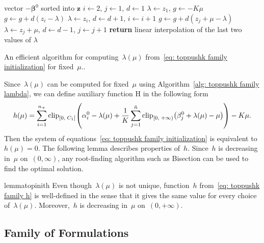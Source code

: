 \begin{algorithm}
  \centering
  \begin{algorithmic}[1]
    \Require vector $-\bm{\beta}^0$ sorted into $\bm{z}$
    \State $i \gets 2$, $j \gets 1$, $d \gets 1$
    \State $\lambda \gets z_1$, $g \gets - K\mu$
        \State $g \gets g + d(z_i - \lambda)$
        \State $\lambda\gets z_i$, $d \gets d+1$, $i \gets i+1$
      \Else
        \State $g \gets g + d(z_j + \mu - \lambda)$
        \State $\lambda \gets z_j + \mu$, $d \gets d - 1$, $j \gets j + 1$
      \EndIf
    \EndWhile
    \State \textbf{return} linear interpolation of the last two values of $\lambda$
  \end{algorithmic}
  \caption{An efficient algorithm for computing~$\lambda(\mu)$ from~\eqref{eq: toppushk family initialization} for fixed~$\mu.$.}
  \label{alg: toppushk family lambda}
\end{algorithm}

Since~$\lambda(\mu)$ can be computed for fixed~$\mu$ using Algorithm~\ref{alg: toppushk family lambda}, we can define auxiliary function H in the following form
\begin{equation}\label{eq: toppushk family h}
  h(\mu)
    = \sum_{i=1}^{\npos} \clip{0}{C_1}{\alpha_i^0 - \lambda(\mu) + \frac{1}{K} \sum_{j=1}^{\ntil} \clip[u]{0}{+\infty}{\beta_j^0+\lambda(\mu) - \mu}} - K \mu.
\end{equation}
Then the system of equations~\eqref{eq: toppushk family initialization} is equivalent to~$h(\mu) = 0.$ The following lemma describes properties of~$h.$ Since~$h$ is decreasing in~$\mu$ on~$(0, \infty)$, any root-finding algorithm such as Bisection can be used to find the optimal solution.

\begin{restatable}{lemma}{topinith}\label{lemma: toppushk family h}
  Even though~$\lambda(\mu)$ is not unique, function~$h$ from~\eqref{eq: toppushk family h} is well-defined in the sense that it gives the same value for every choice of~$\lambda(\mu)$. Moreover,~$h$ is decreasing in~$\mu$ on~$(0, + \infty)$.
\end{restatable}

\subsection{Family of \PatMat Formulations}\label{sec: Pat coordinate descent}

